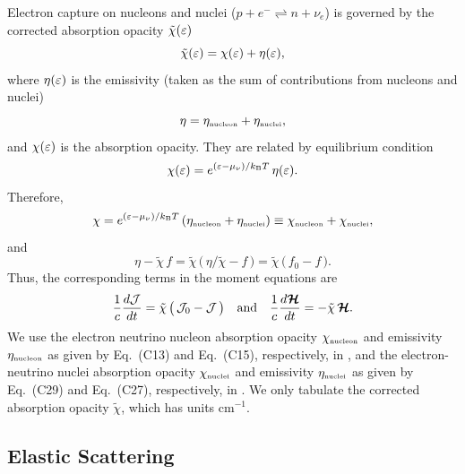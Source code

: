 \documentclass[10pt,preprint]{aastex}
\begin{document}
Electron capture on nucleons and nuclei ($p+e^{-}\rightleftharpoons n+\nu_{e}$) is governed by the corrected absorption opacity $\tilde{\chi}(\varepsilon)$ 
\begin{equation}
  \tilde{\chi}(\varepsilon) = \chi(\varepsilon) + \eta(\varepsilon), 
\end{equation}
where $\eta(\varepsilon)$ is the emissivity (taken as the sum of contributions from nucleons and nuclei)
\begin{equation}
  \eta = \eta_{\mbox{\tiny nucleon}} + \eta_{\mbox{\tiny nuclei}},
\end{equation}
and $ \chi(\varepsilon)$ is the absorption opacity.  
They are related by equilibrium condition
\begin{equation}
  \chi(\varepsilon) = e^{(\varepsilon-\mu_{\nu})/k_{\mbox{\tiny B}}T}\,\eta(\varepsilon). 
\end{equation}
Therefore,
\begin{equation}
  \chi = e^{(\varepsilon-\mu_{\nu})/k_{\mbox{\tiny B}}T}\,(\eta_{\mbox{\tiny nucleon}} + \eta_{\mbox{\tiny nuclei}}) 
  \equiv \chi_{\mbox{\tiny nucleon}} + \chi_{\mbox{\tiny nuclei}},
\end{equation}
and
\begin{equation}
  \eta-\tilde{\chi}\,f=\tilde{\chi}\,\big(\,\eta/\tilde{\chi}-f\,\big)=\tilde{\chi}\,\big(\,f_{0}-f\,\big).  
\end{equation}
Thus, the corresponding terms in the moment equations are
\begin{equation}
  \frac{1}{c}\frac{d \mathcal{J}}{d t}=\tilde{\chi}\,\big(\,\mathcal{J}_{0}-\mathcal{J}\,\big)
  \quad\text{and}\quad
  \frac{1}{c}\frac{d \boldsymbol{\mathcal{H}}}{d t}=-\tilde{\chi}\,\boldsymbol{\mathcal{H}}.  
\end{equation}
We use the electron neutrino nucleon absorption opacity $\chi_{\mbox{\tiny nucleon}}$ and emissivity $\eta_{\mbox{\tiny nucleon}}$ as given by Eq.~(C13) and Eq.~(C15), respectively, in \citet{bruenn_1985}, and the electron-neutrino nuclei absorption opacity $\chi_{\mbox{\tiny nuclei}}$ and emissivity $\eta_{\mbox{\tiny nuclei}}$ as given by Eq.~(C29) and Eq.~(C27), respectively, in \citet{bruenn_1985}.  
We only tabulate the corrected absorption opacity $\tilde{\chi}$, which has units cm$^{-1}$.  

\subsection{Elastic Scattering}
\end{document}
